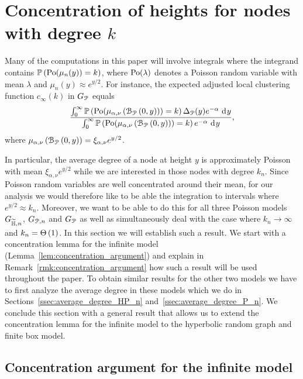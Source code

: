 \section{Concentration of heights for nodes with degree $k$}\label{sec:concentration_argument}

Many of the computations in this paper will involve integrals where the integrand contains $\mathbb{P}\left({\mathrm{Po}}(\mu_n(y)) = k\right)$, where ${\mathrm{Po}}(\lambda)$ denotes a Poisson random variable with mean $\lambda$ and $\mu_n(y) \approx e^{y/2}$. For instance, the expected adjusted local clustering function $c_\infty(k)$ in $G_{{\mathcal P}}$ equals
\[
	\frac{\int_0^\infty \mathbb{P}\left({\mathrm{Po}}(\mu_{\alpha,\nu}\left({\mathcal B}_{{\mathcal P}}\left(0,y\right)\right)) = k\right) \Delta_{{\mathcal P}}(y) e^{-\alpha} \operatorname{\, \mathrm{d}\hspace{-1pt}} y}
	{\int_0^\infty \mathbb{P}\left({\mathrm{Po}}(\mu_{\alpha,\nu}\left({\mathcal B}_{{\mathcal P}}\left(0,y\right)\right)) = k\right) e^{-\alpha} \operatorname{\, \mathrm{d}\hspace{-1pt}} y},
\]
where $\mu_{\alpha,\nu}\left({\mathcal B}_{{\mathcal P}}\left(0,y\right)\right) = \xi_{\alpha,\nu} e^{y/2}$. 

In particular, the average degree of a node at height $y$ is approximately Poisson with mean $\xi_{\alpha,\nu} e^{y/2}$ while we are interested in those nodes with degree $k_n$. Since Poisson random variables are well concentrated around their mean, for our analysis we would therefore like to be able the integration to intervals where $e^{y/2} \approx k_n$. Moreover, we want to be able to do this for all three Poisson models $G_{\widetilde{\mathbb{H}},n}$, $G_{{\mathcal P},n}$ and $G_{{\mathcal P}}$ as well as simultaneously deal with the case where $k_n \to \infty$ and $k_n = \Theta\left(1\right)$. In this section we will establish such a result. We start with a concentration lemma for the infinite model (Lemma~\ref{lem:concentration_argument}) and explain in Remark~\ref{rmk:concentration_argument} how such a result will be used throughout the paper. To obtain similar results for the other two models we have to first analyze the average degree in these models which we do in Sections~\ref{ssec:average_degree_HP_n} and~\ref{ssec:average_degree_P_n}. We conclude this section with a general result that allows us to extend the concentration lemma for the infinite model to the hyperbolic random graph and finite box model. 

\subsection{Concentration argument for the infinite model}

